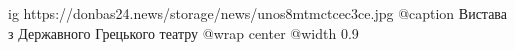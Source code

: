  
 
 
 
 

\ifcmt
  ig https://donbas24.news/storage/news/unos8mtmctcec3ce.jpg
	@caption Вистава з Державного Грецького театру
  @wrap center
  @width 0.9
\fi
